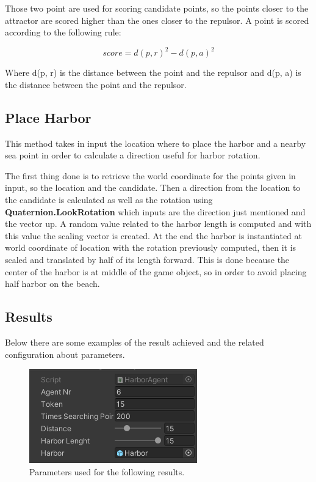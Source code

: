 \documentclass[12pt]{article}
\begin{document}
    Those two point are used for scoring candidate points, so the points closer to the attractor are scored higher than the ones closer to the repulsor. A point is scored 
    according to the following rule:

    \begin{equation}
        score = d(p, r)^2 - d(p, a)^2
    \end{equation}

    \noindent
    Where d(p, r) is the distance between the point and the repulsor and d(p, a) is the distance between the point and the repulsor.

    \subsection{Place Harbor} \label{section:PlaceHarbor}
    This method takes in input the location where to place the harbor and a nearby sea point in order to calculate a direction useful for harbor rotation.
    
    The first thing done is to retrieve the world coordinate for the points given in input, so the location and the candidate. Then a direction from the location to the 
    candidate is calculated as well as the rotation using \textbf{Quaternion.LookRotation} which inputs are the direction just mentioned and the vector up. A random value 
    related to the harbor length is computed and with this value the scaling vector is created. At the end the harbor is instantiated at world coordinate of location with 
    the rotation previously computed, then it is scaled and translated by half of its length forward. This is done because the center of the harbor is at middle of the game
    object, so in order to avoid placing half harbor on the beach.

    \subsection{Results}
    Below there are some examples of the result achieved and the related configuration about parameters.

    \begin{figure}[H]
        \centering
        \includegraphics[scale = 0.8]{images/Harbor agent/Parameters 1}
        \caption{Parameters used for the following results.}
    \end{figure}
\end{document}
